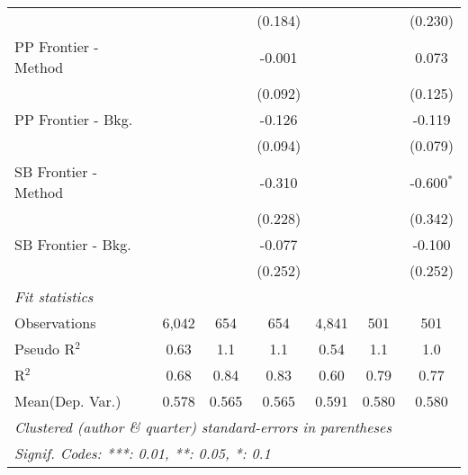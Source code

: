 \begin{tabular}{lcccccc}
                               &         &               & (0.184) &         &               & (0.230)\\   
   PP Frontier - Method        &         &               & -0.001  &         &               & 0.073\\   
                               &         &               & (0.092) &         &               & (0.125)\\   
   PP Frontier - Bkg.          &         &               & -0.126  &         &               & -0.119\\   
                               &         &               & (0.094) &         &               & (0.079)\\   
   SB Frontier - Method        &         &               & -0.310  &         &               & -0.600$^{*}$\\   
                               &         &               & (0.228) &         &               & (0.342)\\   
   SB Frontier - Bkg.          &         &               & -0.077  &         &               & -0.100\\   
                               &         &               & (0.252) &         &               & (0.252)\\   
   \midrule
   \emph{Fit statistics}\\
   Observations                & 6,042   & 654           & 654     & 4,841   & 501           & 501\\  
   Pseudo R$^2$                & 0.63    & 1.1           & 1.1     & 0.54    & 1.1           & 1.0\\  
   R$^2$                       & 0.68    & 0.84          & 0.83    & 0.60    & 0.79          & 0.77\\  
Mean(Dep. Var.) & 0.578 & 0.565 & 0.565 & 0.591 & 0.580 & 0.580 \\
   \midrule \midrule
   \multicolumn{7}{l}{\emph{Clustered (author \& quarter) standard-errors in parentheses}}\\
   \multicolumn{7}{l}{\emph{Signif. Codes: ***: 0.01, **: 0.05, *: 0.1}}\\
\end{tabular}
\par\endgroup
